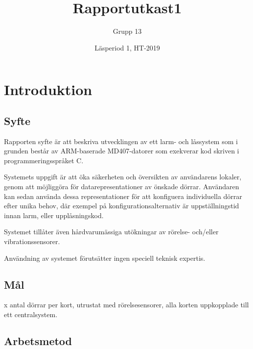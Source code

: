 \documentclass{article}
\title{Rapportutkast1}
\author{Grupp 13}
\date{Läsperiod 1, HT-2019}
\begin{document}
\maketitle
{}
\newpage

\tableofcontents
\newpage



\section{Introduktion}
\subsection{Syfte} %
Rapporten syfte är att beskriva utvecklingen av ett larm- och
 låssystem som i grunden består av ARM-baserade MD407-datorer
  som exekverar kod skriven i programmeringsspråket C.

Systemets uppgift är att öka säkerheten och översikten av
 användarens lokaler, genom att möjliggöra för 
 datarepresentationer av önskade dörrar. Användaren 
 kan sedan använda dessa representationer för att konfiguera 
 individuella dörrar efter unika behov, där exempel på 
 konfigurationsalternativ är uppställningstid innan larm,
  eller upplåsningskod. 

Systemet tillåter även hårdvarumässiga utökningar av 
rörelse- och/eller vibrationssensorer.

Användning av systemet förutsätter ingen speciell 
teknisk expertis.


\subsection{Mål} %
x antal dörrar per kort, utrustat med rörelsesensorer, alla korten
 uppkopplade till ett centralsystem.

\subsection{Arbetsmetod} %
\end{document}
